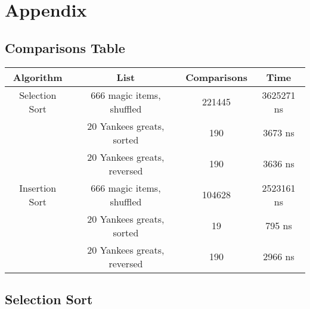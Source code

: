 \documentclass[letterpaper, 10pt,DIV=13]{scrartcl}
\numberwithin{equation}{section} %
\numberwithin{figure}{section} %
\numberwithin{table}{section} %
\begin{document}
\section{Appendix}
\subsection{Comparisons Table}\label{comparisonsTable}
\begin{center}
  \begin{tabular}{|c|c|c|c|}
    \hline
    Algorithm & List & Comparisons & Time \\
    \hline
    Selection Sort & 666 magic items, shuffled & 221445 & 3625271 ns \\
    \hline
    & 20 Yankees greats, sorted & 190 & 3673 ns \\
    \hline
    & 20 Yankees greats, reversed & 190 & 3636 ns \\
    \hline
    Insertion Sort & 666 magic items, shuffled & 104628 & 2523161 ns \\
    \hline
    & 20 Yankees greats, sorted & 19 & 795 ns \\
    \hline
    & 20 Yankees greats, reversed & 190 & 2966 ns \\
    \hline
  \end{tabular}
\end{center}

\lstset{numbers=left, numberstyle=\tiny, stepnumber=1, numbersep=5pt}


\subsection{Selection Sort}\label{selectionSortListing}

\end{document}
